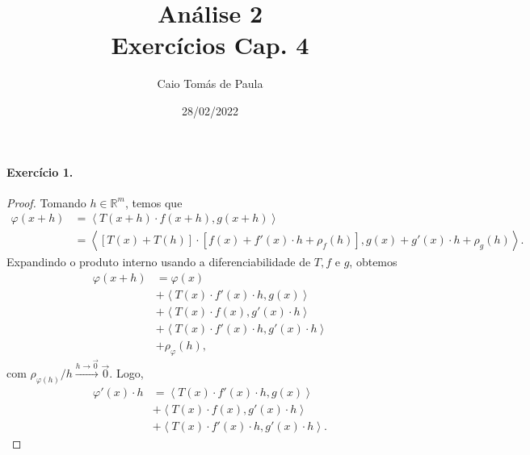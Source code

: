 \documentclass[12pt,a4paper]{article}
\title{\textbf{Análise 2}\\ Exercícios Cap. 4}
\author{Caio Tomás de Paula}
\date{28/02/2022}
\newcommand{\R}{\mathbb{R}}
\begin{document}
\maketitle

\paragraph{Exercício 1.}
    \begin{proof}
        Tomando $h\in\R^m$, temos que
        \begin{align*}
            \varphi(x+h) &= \left\langle T(x+h)\cdot f(x+h), g(x+h) \right\rangle \\
                         &= \left\langle [T(x) + T(h)]\cdot [f(x) + f'(x)\cdot h + \rho_f(h)], 
                                         g(x) + g'(x)\cdot h + \rho_g(h) \right\rangle.
        \end{align*}
        Expandindo o produto interno usando a diferenciabilidade de $T, f$ e $g$, obtemos
        \begin{align*}
            \varphi(x+h) &= \varphi(x) \\
                         &+ \left\langle T(x)\cdot f'(x)\cdot h, g(x) \right\rangle \\
                         &+ \left\langle T(x)\cdot f(x), g'(x)\cdot h \right\rangle \\
                         &+ \left\langle T(x)\cdot f'(x)\cdot h, g'(x)\cdot h \right\rangle \\
                         &+ \rho_{\varphi}(h),
        \end{align*}
        com $\rho_{\varphi(h)}/h \xrightarrow{h\to\vec{0}} \vec{0}$. Logo, 
        \begin{align*}
            \varphi'(x)\cdot h &= \left\langle T(x)\cdot f'(x)\cdot h, g(x) \right\rangle \\
                         &+ \left\langle T(x)\cdot f(x), g'(x)\cdot h \right\rangle \\
                         &+ \left\langle T(x)\cdot f'(x)\cdot h, g'(x)\cdot h \right\rangle.
        \end{align*}
    \end{proof}
\end{document}
